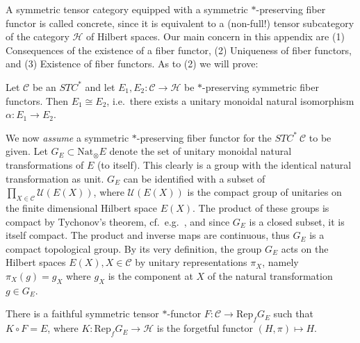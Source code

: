 \documentclass[12pt]{article}
\theoremstyle{definition}
\theoremstyle{definition}
\theoremstyle{remark}
\def\2#1{{\mathcal #1}}
\newcommand{\Rep}{\mathrm{Rep}}
\newcommand{\rarr}{\rightarrow}
\newcommand{\Nat}{\mathrm{Nat}}
\begin{document}
A symmetric tensor category equipped with a symmetric $*$-preserving fiber functor is called
concrete, since it is equivalent to a (non-full!) tensor subcategory of the category $\2H$ of
Hilbert spaces. Our main concern in this appendix  are (1) Consequences of the existence of a fiber
functor, (2) Uniqueness of fiber functors, and (3) Existence of fiber functors. As to (2) we will prove:

\btheor \label{theor-uniq1} 
Let $\2C$ be an $STC^*$ and let $E_1,E_2:\2C\rarr\2H$ be $*$-preserving symmetric fiber
functors. Then $E_1\cong E_2$, i.e.\ there exists a unitary monoidal natural isomorphism  
$\alpha: E_1\rarr E_2$.
\etheor

We now {\it assume} a symmetric $*$-preserving fiber functor for the $STC^*\ \2C$ to be given. Let
$G_E\subset\Nat_\otimes E$ denote the set of unitary monoidal natural transformations of $E$ (to 
itself). This clearly is a group with the identical natural transformation as unit. $G_E$ can be
identified with a subset of $\prod_{X\in\2C}\2U(E(X))$, where $\2U(E(X))$ is the compact group of
unitaries on the finite dimensional Hilbert space $E(X)$. The product of these groups is compact by
Tychonov's theorem, cf.\ e.g.\ \cite[Theorem 1.6.10]{ped}, and since $G_E$ is a closed subset, it is
itself compact. The product and inverse maps are continuous, thus $G_E$ is a compact topological
group. By its very definition, the group $G_E$ acts on the Hilbert spaces $E(X), X\in\2C$ by unitary
representations $\pi_X$, namely $\pi_X(g)=g_X$ where $g_X$ is the component at $X$ of the natural
transformation $g\in G_E$.  

\bprop
There is a faithful symmetric tensor $*$-functor $F: \2C\rarr\Rep_fG_E$ such that $K\circ F=E$,
where $K:\Rep_fG_E \rarr\2H$ is the forgetful functor $(H,\pi)\mapsto H$.
\eprop 
\end{document}
